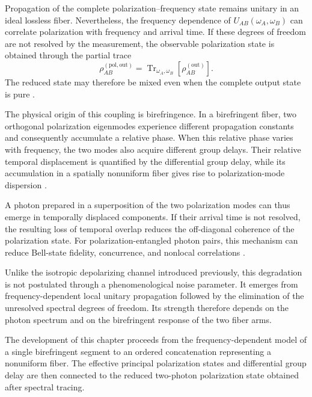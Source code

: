 Propagation of the complete polarization--frequency state remains unitary in
an ideal lossless fiber. Nevertheless, the frequency dependence of
\(U_{AB}(\omega_A,\omega_B)\) can correlate polarization with frequency and
arrival time. If these degrees of freedom are not resolved by the
measurement, the observable polarization state is obtained through the
partial trace
%
\begin{equation}
    \rho_{AB}^{(\mathrm{pol,out})}
    =
    \operatorname{Tr}_{\omega_A,\omega_B}
    \left[
        \rho_{AB}^{(\mathrm{out})}
    \right].
    \label{eq:frequency_partial_trace}
\end{equation}
%
The reduced state may therefore be mixed even when the complete output state
is pure
\cite{nielsen_chuang_qcqi,poon_law_stochastic_pmd_2008}.

\medskip

The physical origin of this coupling is birefringence. In a birefringent
fiber, two orthogonal polarization eigenmodes experience different
propagation constants and consequently accumulate a relative phase. When
this relative phase varies with frequency, the two modes also acquire
different group delays. Their relative temporal displacement is quantified
by the differential group delay, while its accumulation in a spatially
nonuniform fiber gives rise to polarization-mode dispersion
\cite{foschini_poole_statistical_pmd_1991}.

A photon prepared in a superposition of the two polarization modes can thus
emerge in temporally displaced components. If their arrival time is not
resolved, the resulting loss of temporal overlap reduces the off-diagonal
coherence of the polarization state. For polarization-entangled photon
pairs, this mechanism can reduce Bell-state fidelity, concurrence, and
nonlocal correlations
\cite{brodsky_loss_polarization_entanglement_2011,
antonelli_shtaif_brodsky_pmd_2011}.

Unlike the isotropic depolarizing channel introduced previously, this
degradation is not postulated through a phenomenological noise parameter. It
emerges from frequency-dependent local unitary propagation followed by the
elimination of the unresolved spectral degrees of freedom. Its strength
therefore depends on the photon spectrum and on the birefringent response of
the two fiber arms.

\medskip

The development of this chapter proceeds from the frequency-dependent model
of a single birefringent segment to an ordered concatenation representing a
nonuniform fiber. The effective principal polarization states and
differential group delay are then connected to the reduced two-photon
polarization state obtained after spectral tracing.

